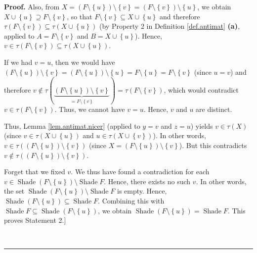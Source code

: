 \documentclass[numbers=enddot,12pt,final,onecolumn]{scrartcl}%
\theoremstyle{definition}
\newenvironment{proof}[1][Proof]{\noindent\textbf{#1.} }{\ \rule{0.5em}{0.5em}}
\begin{document}
\begin{proof}
Also, from $X=\left(  F\setminus\left\{  u\right\}  \right)  \setminus\left\{
v\right\}  =\left(  F\setminus\left\{  v\right\}  \right)  \setminus\left\{
u\right\}  $, we obtain $X\cup\left\{  u\right\}  \supseteq F\setminus\left\{
v\right\}  $, so that $F\setminus\left\{  v\right\}  \subseteq X\cup\left\{
u\right\}  $ and therefore $\tau\left(  F\setminus\left\{  v\right\}  \right)
\subseteq\tau\left(  X\cup\left\{  u\right\}  \right)  $ (by Property 2 in
Definition \ref{def.antimat} \textbf{(a)}, applied to $A=F\setminus\left\{
v\right\}  $ and $B=X\cup\left\{  u\right\}  $). Hence, $v\in\tau\left(
F\setminus\left\{  v\right\}  \right)  \subseteq\tau\left(  X\cup\left\{
u\right\}  \right)  $.

If we had $v=u$, then we would have $\left(  F\setminus\left\{  u\right\}
\right)  \setminus\left\{  v\right\}  =\left(  F\setminus\left\{  u\right\}
\right)  \setminus\left\{  u\right\}  =F\setminus\left\{  u\right\}
=F\setminus\left\{  v\right\}  $ (since $u=v$) and therefore $v\notin%
\tau\left(  \underbrace{\left(  F\setminus\left\{  u\right\}  \right)
\setminus\left\{  v\right\}  }_{=F\setminus\left\{  v\right\}  }\right)
=\tau\left(  F\setminus\left\{  v\right\}  \right)  $, which would contradict
$v\in\tau\left(  F\setminus\left\{  v\right\}  \right)  $. Thus, we cannot
have $v=u$. Hence, $v$ and $u$ are distinct.

Thus, Lemma \ref{lem.antimat.nicer} (applied to $y=v$ and $z=u$) yields
$v\in\tau\left(  X\right)  $ (since $v\in\tau\left(  X\cup\left\{  u\right\}
\right)  $ and $u\in\tau\left(  X\cup\left\{  v\right\}  \right)  $). In other
words, $v\in\tau\left(  \left(  F\setminus\left\{  u\right\}  \right)
\setminus\left\{  v\right\}  \right)  $ (since $X=\left(  F\setminus\left\{
u\right\}  \right)  \setminus\left\{  v\right\}  $). But this contradicts
$v\notin\tau\left(  \left(  F\setminus\left\{  u\right\}  \right)
\setminus\left\{  v\right\}  \right)  $.

Forget that we fixed $v$. We thus have found a contradiction for each
$v\in\operatorname*{Shade}\left(  F\setminus\left\{  u\right\}  \right)
\setminus\operatorname*{Shade}F$. Hence, there exists no such $v$. In other
words, the set $\operatorname*{Shade}\left(  F\setminus\left\{  u\right\}
\right)  \setminus\operatorname*{Shade}F$ is empty. Hence,
$\operatorname*{Shade}\left(  F\setminus\left\{  u\right\}  \right)
\subseteq\operatorname*{Shade}F$. Combining this with $\operatorname*{Shade}%
F\subseteq\operatorname*{Shade}\left(  F\setminus\left\{  u\right\}  \right)
$, we obtain $\operatorname*{Shade}\left(  F\setminus\left\{  u\right\}
\right)  =\operatorname*{Shade}F$. This proves Statement 2.]


\end{proof}
\end{document}
